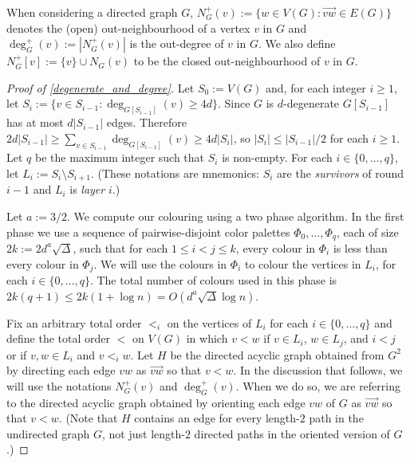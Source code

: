\documentclass{patmorin}
\newcommand{\defin}[1]{\emph{\color{brightmaroon}#1}}
\begin{document}
When considering a directed graph $G$, $N^+_{G}(v):=\{w\in V(G):\overrightarrow{vw}\in E(G)\}$ denotes the (open) out-neighbourhood of a vertex $v$ in $G$ and $\deg^+_{G}(v):=|N^+_G(v)|$ is the out-degree of $v$ in $G$.  We also define $N^+_{G}[v]:=\{v\}\cup N_{G}(v)$ to be the closed out-neighbourhood of $v$ in $G$.

\begin{proof}[Proof of \cref{degenerate_and_degree}]
  Let $S_0:=V(G)$ and, for each integer $i\ge 1$, let $S_i:=\{v\in S_{i-1}:\deg_{G[S_{i-1}]}(v)\ge 4d\}$.  Since $G$ is $d$-degenerate $G[S_{i-1}]$ has at most $d|S_{i-1}|$ edges.  Therefore $2d|S_{i-1}|\ge \sum_{v\in S_{i-1}} \deg_{G[S_{i-1}]}(v)\ge 4d|S_i|$, so $|S_i|\le |S_{i-1}|/2$ for each $i\ge 1$.  Let $q$ be the maximum integer such that $S_i$ is non-empty.  For each $i\in\{0,\ldots,q\}$, let $L_i:=S_i\setminus S_{i+1}$.  (These notations are mnemonics: $S_i$ are the \defin{survivors} of round $i-1$ and $L_i$ is \defin{layer} $i$.)

  Let $a:=3/2$.
  We compute our colouring using a two phase algorithm. In the first phase we use a sequence of pairwise-disjoint color palettes $\Phi_0,\ldots,\Phi_{q}$, each of size $2k:=2d^{a}\sqrt{\Delta}$, such that for each $1\le i < j\le k$, every colour in $\Phi_i$ is less than every colour in $\Phi_j$.  We will use the colours in $\Phi_i$ to colour the vertices in $L_i$, for each $i\in\{0,\ldots,q\}$.  The total number of colours used in this phase is $2k(q+1)\le 2k(1+\log n)=O(d^{a}\sqrt{\Delta}\log n)$.


  Fix an arbitrary total order $<_i$ on the vertices of $L_i$ for each $i\in\{0,\ldots,q\}$ and define the total order $<$ on $V(G)$ in which $v <w$ if $v\in L_i$, $w\in L_j$, and $i<j$ or if $v,w\in L_i$ and $v<_iw$. Let $H$ be the directed acyclic graph obtained from $G^2$ by directing each edge $vw$ as $\overrightarrow{vw}$ so that $v<w$.  In the discussion that follows, we will use the notations $N^+_G(v)$ and $\deg^+_G(v)$.  When we do so, we are referring to the directed acyclic graph obtained by orienting each edge $vw$ of $G$ as $\overrightarrow{vw}$ so that $v<w$.  (Note that $H$ contains an edge for every length-$2$ path in the undirected graph $G$, not just length-$2$ directed paths in the oriented version of $G$.)


\end{proof}
\end{document}
